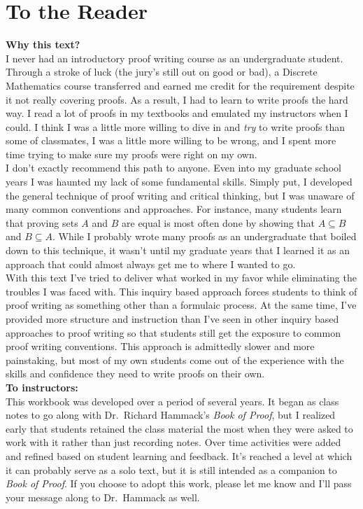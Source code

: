 \chapter*{To the Reader}

\noindent \textbf{Why this text?}\\
I never had an introductory proof writing course as an undergraduate student.  Through a stroke of luck (the jury's still out on good or bad), a Discrete Mathematics course transferred and earned me credit for the requirement despite it not really covering proofs.  As a result, I had to learn to write proofs the hard way.  I read a lot of proofs in my textbooks and emulated my instructors when I could.  I think I was a little more willing to dive in and \textit{try} to write proofs than some of classmates, I was a little more willing to be wrong, and I spent more time trying to make sure my proofs were right on my own.\\

I don't exactly recommend this path to anyone.  Even into my graduate school years I was haunted my lack of some fundamental skills.  Simply put, I developed the general technique of proof writing and critical thinking, but I was unaware of many common conventions and approaches.  For instance, many students learn that proving sets $A$ and $B$ are equal is most often done by showing that $A \subseteq B$ and $B \subseteq A$.  While I probably wrote many proofs as an undergraduate that boiled down to this technique, it wasn't until my graduate years that I learned it as an approach that could almost always get me to where I wanted to go.\\

With this text I've tried to deliver what worked in my favor while eliminating the troubles I was faced with.  This inquiry based approach forces students to think of proof writing as something other than a formulaic process.  At the same time, I've provided more structure and instruction than I've seen in other inquiry based approaches to proof writing so that students still get the exposure to common proof writing conventions.  This approach is admittedly slower and more painstaking, but most of my own students come out of the experience with the skills and confidence they need to write proofs on their own.\\

\noindent \textbf{To instructors:}\\
This workbook was developed over a period of several years.  It began as class notes to go along with Dr.~Richard Hammack's \textit{Book of Proof}, but I realized early that students retained the class material the most when they were asked to work with it rather than just recording notes.  Over time activities were added and refined based on student learning and feedback.  It's reached a level at which it can probably serve as a solo text, but it is still intended as a companion to \textit{Book of Proof}.  If you choose to adopt this work, please let me know and I'll pass your message along to Dr.~Hammack as well.\\

